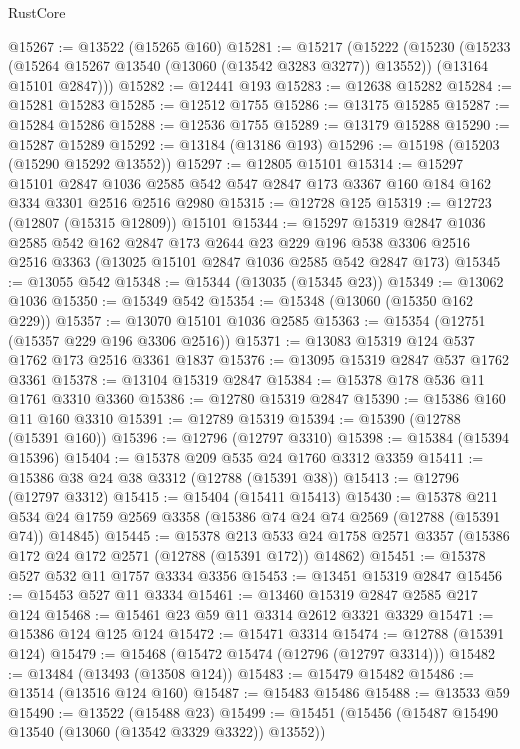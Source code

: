 \begin{lexlean}{RustCore}
\begin{coremodule}
@15267 := @13522 (@15265 @160)
@15281 := @15217
    (@15222
      (@15230
        (@15233 (@15264 @15267 @13540 (@13060 (@13542 @3283 @3277)) @13552))
        (@13164 @15101 @2847)))
@15282 := @12441 @193
@15283 := @12638 @15282
@15284 := @15281 @15283
@15285 := @12512 @1755
@15286 := @13175 @15285
@15287 := @15284 @15286
@15288 := @12536 @1755
@15289 := @13179 @15288
@15290 := @15287 @15289
@15292 := @13184 (@13186 @193)
@15296 := @15198 (@15203 (@15290 @15292 @13552))
@15297 := @12805 @15101
@15314 := @15297
    @15101
    @2847
    @1036
    @2585
    @542
    @547
    @2847
    @173
    @3367
    @160
    @184
    @162
    @334
    @3301
    @2516
    @2516
    @2980
@15315 := @12728 @125
@15319 := @12723 (@12807 (@15315 @12809)) @15101
@15344 := @15297
    @15319
    @2847
    @1036
    @2585
    @542
    @162
    @2847
    @173
    @2644
    @23
    @229
    @196
    @538
    @3306
    @2516
    @2516
    @3363
    (@13025 @15101 @2847 @1036 @2585 @542 @2847 @173)
@15345 := @13055 @542
@15348 := @15344 (@13035 (@15345 @23))
@15349 := @13062 @1036
@15350 := @15349 @542
@15354 := @15348 (@13060 (@15350 @162 @229))
@15357 := @13070 @15101 @1036 @2585
@15363 := @15354 (@12751 (@15357 @229 @196 @3306 @2516))
@15371 := @13083 @15319 @124 @537 @1762 @173 @2516 @3361 @1837
@15376 := @13095 @15319 @2847 @537 @1762 @3361
@15378 := @13104 @15319 @2847
@15384 := @15378 @178 @536 @11 @1761 @3310 @3360
@15386 := @12780 @15319 @2847
@15390 := @15386 @160 @11 @160 @3310
@15391 := @12789 @15319
@15394 := @15390 (@12788 (@15391 @160))
@15396 := @12796 (@12797 @3310)
@15398 := @15384 (@15394 @15396)
@15404 := @15378 @209 @535 @24 @1760 @3312 @3359
@15411 := @15386 @38 @24 @38 @3312 (@12788 (@15391 @38))
@15413 := @12796 (@12797 @3312)
@15415 := @15404 (@15411 @15413)
@15430 := @15378
    @211
    @534
    @24
    @1759
    @2569
    @3358
    (@15386 @74 @24 @74 @2569 (@12788 (@15391 @74)) @14845)
@15445 := @15378
    @213
    @533
    @24
    @1758
    @2571
    @3357
    (@15386 @172 @24 @172 @2571 (@12788 (@15391 @172)) @14862)
@15451 := @15378 @527 @532 @11 @1757 @3334 @3356
@15453 := @13451 @15319 @2847
@15456 := @15453 @527 @11 @3334
@15461 := @13460 @15319 @2847 @2585 @217 @124
@15468 := @15461 @23 @59 @11 @3314 @2612 @3321 @3329
@15471 := @15386 @124 @125 @124
@15472 := @15471 @3314
@15474 := @12788 (@15391 @124)
@15479 := @15468 (@15472 @15474 (@12796 (@12797 @3314)))
@15482 := @13484 (@13493 (@13508 @124))
@15483 := @15479 @15482
@15486 := @13514 (@13516 @124 @160)
@15487 := @15483 @15486
@15488 := @13533 @59
@15490 := @13522 (@15488 @23)
@15499 := @15451 (@15456 (@15487 @15490 @13540 (@13060 (@13542 @3329 @3322)) @13552))

\end{coremodule}
\end{lexlean}
